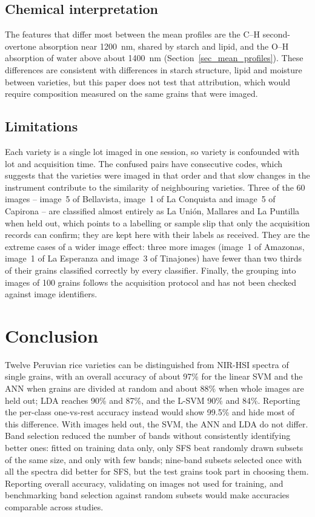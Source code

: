 \documentclass[final,5p,times,twocolumn]{elsarticle}
\newcommand{\added}[1]{{\color{blue}#1}}
\begin{document}
{\subsection{Chemical interpretation}
The features that differ most between the mean profiles are the C--H second-overtone absorption near 1200~nm, shared by starch and lipid, and the O--H absorption of water above about 1400~nm (Section~\ref{sec_mean_profiles}). These differences are consistent with differences in starch structure, lipid and moisture between varieties, but this paper does not test that attribution, which would require composition measured on the same grains that were imaged.

\subsection{Limitations}\label{sec_limitations}
Each variety is a single lot imaged in one session, so variety is confounded with lot and acquisition time. The confused pairs have consecutive codes, which suggests that the varieties were imaged in that order and that slow changes in the instrument contribute to the similarity of neighbouring varieties. Three of the 60 images -- image~5 of Bellavista, image~1 of La Conquista and image~5 of Capirona -- are classified almost entirely as La Uni\'on, Mallares and La Puntilla when held out, which points to a labelling or sample slip that only the acquisition records can confirm; they are kept here with their labels as received. They are the extreme cases of a wider image effect: three more images (image~1 of Amazonas, image~1 of La Esperanza and image~3 of Tinajones) have fewer than two thirds of their grains classified correctly by every classifier. Finally, the grouping into images of 100 grains follows the acquisition protocol and has not been checked against image identifiers.}

\section{Conclusion}

\added{Twelve Peruvian rice varieties can be distinguished from NIR-HSI spectra of single grains, with an overall accuracy of about 97\% for the linear SVM and the ANN when grains are divided at random and about 88\% when whole images are held out; LDA reaches 90\% and 87\%, and the L-SVM 90\% and 84\%. Reporting the per-class one-vs-rest accuracy instead would show 99.5\% and hide most of this difference. With images held out, the SVM, the ANN and LDA do not differ. Band selection reduced the number of bands without consistently identifying better ones: fitted on training data only, only SFS beat randomly drawn subsets of the same size, and only with few bands; nine-band subsets selected once with all the spectra did better for SFS, but the test grains took part in choosing them. Reporting overall accuracy, validating on images not used for training, and benchmarking band selection against random subsets would make accuracies comparable across studies.}
\end{document}
